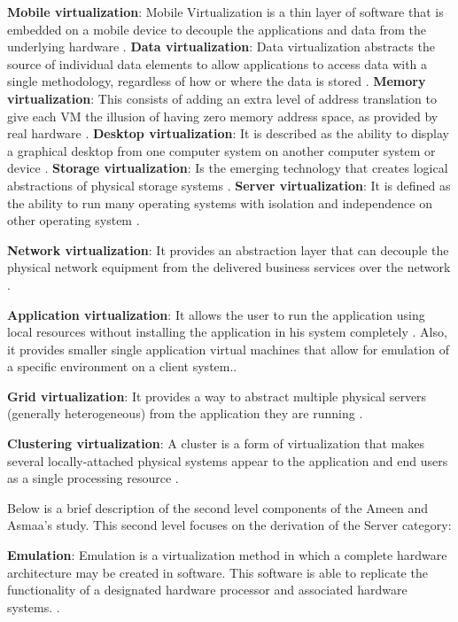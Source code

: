    \textbf{Mobile virtualization}: Mobile Virtualization is a thin layer of software that is embedded on a mobile device to decouple the applications and data from the underlying hardware \cite{Ameen2013, VMware2018Website}. \textbf{Data virtualization}: Data virtualization abstracts the source of individual data elements to allow applications to access data with a single methodology, regardless of how or where the data is stored \cite{Mann2006}. \textbf{Memory virtualization}: This consists of adding an extra level of address translation to give each VM the illusion of having zero memory address space, as provided by real hardware \cite{Ameen2013, Waldspurger2002}. \textbf{Desktop virtualization}: It is described as the ability to display a graphical desktop from one computer system on another computer system or device \cite{Ameen2013, VonHagen2008}. \textbf{Storage virtualization}: Is the emerging technology that creates logical abstractions of physical storage systems \cite{Ameen2013, Bigang2005}. \textbf{Server virtualization}: It is defined as the ability to run many operating systems with isolation and independence on other operating system \cite{Ameen2013}.
    
    \textbf{Network virtualization}: It provides an abstraction layer that can decouple the physical network equipment from the delivered business services over the network \cite{Annapareddy2011}.
    
    \textbf{Application virtualization}: It allows the user to run the application using local resources without installing the application in his system completely \cite{Annapareddy2011}. Also, it provides smaller single application virtual machines that allow for emulation of a specific environment on a client system.\cite{White2010}.
    
    \textbf{Grid virtualization}: It provides a way to abstract multiple physical servers (generally heterogeneous) from the application they are running \cite{Mann2006}.
    
    \textbf{Clustering virtualization}: A cluster is a form of virtualization that makes several locally-attached physical systems appear to the application and end users as a single processing resource \cite{Ameen2013, Mann2006}.
    
    Below is a brief description of the second level components of the Ameen and Asmaa's study. This second level focuses on the derivation of the Server category:
    
    \textbf{Emulation}: Emulation is a virtualization method in which a complete hardware architecture may be created in software. This software is able to replicate the functionality of a designated hardware processor and associated hardware systems. \cite{Mann2006, Chiueh2005, VonHagen2008}.

